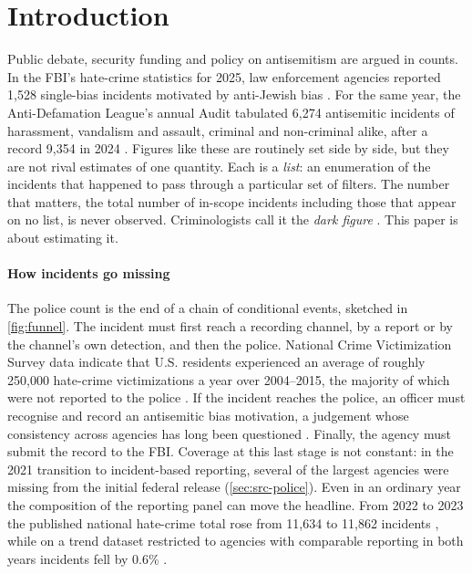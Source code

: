 \section{Introduction}\label{sec:intro}

Public debate, security funding and policy on antisemitism are argued in
counts. In the FBI's hate-crime statistics for 2025, law enforcement
agencies reported 1{,}528 single-bias incidents motivated by anti-Jewish bias
\citep{fbi2026hate,adl2026fbi}. For the same year, the Anti-Defamation
League's annual Audit tabulated 6{,}274 antisemitic incidents of harassment,
vandalism and assault, criminal and non-criminal alike, after a record 9{,}354
in 2024 \citep{adl2026audit,adl2025audit}. Figures like these are routinely
set side by side, but they are not rival estimates of one quantity. Each is a
\emph{list}: an enumeration of the incidents that happened to pass through a
particular set of filters. The number that matters, the total number of
in-scope incidents including those that appear on no list, is never observed.
Criminologists call it the \emph{dark figure} \citep{pezzella2019}. This paper
is about estimating it.

%
\paragraph{How incidents go missing}
The police count is the end of a chain of conditional events, sketched in
\cref{fig:funnel}. The incident must first reach a recording channel, by a
report or by the channel's own detection, and then the police. National Crime
Victimization Survey data indicate that U.S. residents experienced an average
of roughly 250{,}000 hate-crime victimizations a year over 2004--2015, the
majority of which were not reported to the police \citep{masucci2017}. If the
incident reaches the police, an officer must recognise and record an
antisemitic bias motivation, a judgement whose consistency across agencies has
long been questioned \citep{mcdevitt2003}. Finally, the agency must submit the
record to the FBI. Coverage at this last stage is not constant: in the 2021
transition to incident-based reporting, several of the largest agencies were
missing from the initial federal release (\cref{sec:src-police}). Even in an
ordinary year the composition of the reporting panel can move the headline.
From 2022 to 2023 the published national hate-crime total rose from 11{,}634
to 11{,}862 incidents \citep{dojcrs2024}, while on a trend dataset restricted
to agencies with comparable reporting in both years incidents fell by 0.6\%
\citep{fbi2024crimenation}.

